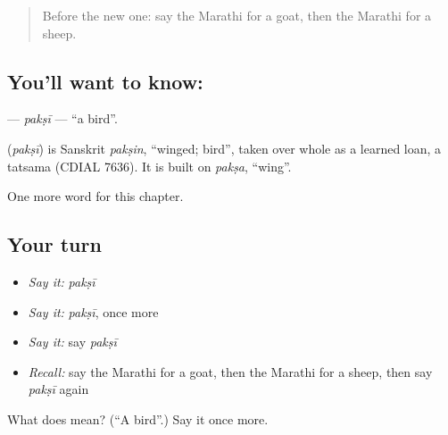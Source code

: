 \label{lesson:MR-C100-paksi}



\begin{quote}
Before the new one: say the Marathi for a goat, then the Marathi for a sheep.
\end{quote}

\subsection*{You'll want to know: }
\textbf{} — \emph{pakṣī} — \textquotedblleft{}a bird\textquotedblright{}.

\begin{cousinweb}
\textbf{} (\emph{pakṣī}) is Sanskrit \emph{pakṣin}, \textquotedblleft{}winged; bird\textquotedblright{}, taken over whole as a learned loan, a tatsama (CDIAL 7636). It is built on \emph{pakṣa}, \textquotedblleft{}wing\textquotedblright{}.
\end{cousinweb}

\begin{grammarlens}[title={What you've built}]
One more word for this chapter.
\end{grammarlens}

\subsection*{Your turn}
\begin{itemize}
\raggedright
  \item \emph{Say it:} \emph{pakṣī}
  \item \emph{Say it:} \emph{pakṣī}, once more
  \item \emph{Say it:} say \emph{pakṣī}
  \item \emph{Recall:} say the Marathi for a goat, then the Marathi for a sheep, then say \emph{pakṣī} again
\end{itemize}

\begin{tcolorbox}[breakable,colback=teal!4,colframe=teal!35!black,title={Before you move on}]
What does  mean? (\textquotedblleft{}A bird\textquotedblright{}.) Say it once more.
\end{tcolorbox}

